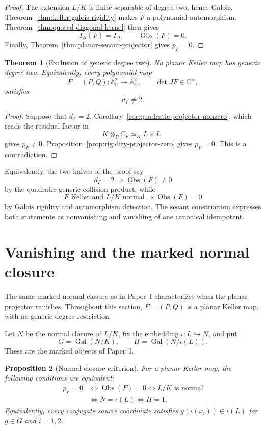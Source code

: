 \documentclass[11pt]{article}
\newtheorem{theorem}{Theorem}[section]
\newtheorem{proposition}[theorem]{Proposition}
\DeclareMathOperator{\Gal}{Gal}
\newcommand{\A}{\mathbb A}
\newcommand{\C}{\mathbb C}
\newcommand{\Obs}{\operatorname{Obs}}
\begin{document}
\begin{proof}
The extension \(L/K\) is finite separable of degree two, hence Galois.
Theorem~\ref{thm:keller-galois-rigidity} makes \(F\) a polynomial
automorphism.  Theorem~\ref{thm:quoted-diagonal-kernel} then gives
\[
  I_R(F)=I_\Delta,\qquad \Obs(F)=0.
\]
Finally, Theorem~\ref{thm:planar-secant-projector} gives \(p_F=0\).
\end{proof}

\begin{theorem}[Exclusion of generic degree two]
\label{thm:no-planar-keller-degree-two}
No planar Keller map has generic degree two.  Equivalently, every
polynomial map
\[
  F=(P,Q)\colon\A^2_{\C}\longrightarrow\A^2_{\C},
  \qquad
  \det JF\in\C^\times,
\]
satisfies
\[
  d_F\neq2.
\]
\end{theorem}

\begin{proof}
Suppose that \(d_F=2\).
Corollary~\ref{cor:quadratic-projector-nonzero}, which reads the residual
factor in
\[
  K\otimes_BC_F\simeq_K L\times L,
\]
gives \(p_F\neq0\).  Proposition~\ref{prop:rigidity-projector-zero} gives
\(p_F=0\).  This is a contradiction.
\end{proof}

Equivalently, the two halves of the proof say
\[
  d_F=2\Longrightarrow\Obs(F)\neq0
\]
by the quadratic generic collision product, while
\[
  \text{\(F\) Keller and \(L/K\) normal}
  \Longrightarrow\Obs(F)=0
\]
by Galois rigidity and automorphism detection.  The secant construction
expresses both statements as nonvanishing and vanishing of one canonical
idempotent.

\section{Vanishing and the marked normal closure}
\label{sec:vanishing-criterion}

The same marked normal closure as in Paper~I characterizes when the
planar projector vanishes.  Throughout this section, \(F=(P,Q)\) is a
planar Keller map, with no generic-degree restriction.

Let \(N\) be the normal closure of \(L/K\), fix the embedding
\(\iota\colon L\hookrightarrow N\), and put
\[
  G=\Gal(N/K),\qquad H=\Gal(N/\iota(L)).
\]
These are the marked objects of Paper~I.

\begin{proposition}[Normal-closure criterion]
\label{prop:normal-closure-criterion}
For a planar Keller map, the following conditions are equivalent:
\[
  \begin{aligned}
  p_F=0
  &\Longleftrightarrow\Obs(F)=0
   \Longleftrightarrow L/K\text{ is normal}\\
  &\Longleftrightarrow N=\iota(L)
   \Longleftrightarrow H=1.
  \end{aligned}
\]
Equivalently, every conjugate source coordinate satisfies
\(g(\iota(x_i))\in\iota(L)\) for \(g\in G\) and \(i=1,2\).
\end{proposition}
\end{document}
